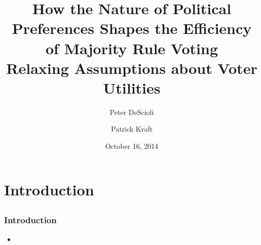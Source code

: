 \documentclass{beamer}
\author[DeScioli \& Kraft]{Peter DeScioli \and Patrick Kraft}
\institute[Stony Brook]{Center for Behavioral Political Economy}
\title[Voter Utilities and Majority Voting]{How the Nature of Political Preferences Shapes the Efficiency of Majority Rule Voting \\
{\small Relaxing Assumptions about Voter Utilities}}
\date{October 16, 2014}
\begin{document}
\frame{\titlepage}

\section{Introduction}
\subsection{}
\begin{frame}%
\frametitle{Introduction}
\begin{itemize}
\item
\end{itemize}
\end{frame}

%
%
\end{document}
